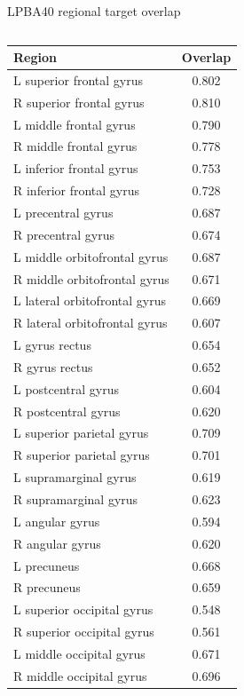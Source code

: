 \documentclass[xcolor=dvipsnames,serif,10pt]{beamer}
\newcommand{\ColIndent}{\hspace{\labelwidth}\hspace{\labelsep}\hspace{\labelsep}\hspace{\labelsep}\hspace{\labelsep}}
\begin{document}
\begin{frame}{LPBA40 regional target overlap}

\setlength{\tabcolsep}{4pt}

\fontsize{5}{6}\selectfont

\begin{columns}[totalwidth=0.7\textwidth,t]
\ColIndent
\begin{column}[t]{5cm}
\begin{tabular}{lc}
{\bf Region} & {\bf Overlap} \\
\hline
L superior frontal gyrus & 0.802 \\
R superior frontal gyrus & 0.810 \\
L middle frontal gyrus & 0.790 \\
R middle frontal gyrus & 0.778 \\
L inferior frontal gyrus & 0.753 \\
R inferior frontal gyrus & 0.728 \\
L precentral gyrus & 0.687 \\
R precentral gyrus & 0.674 \\
L middle orbitofrontal gyrus & 0.687 \\
R middle orbitofrontal gyrus & 0.671 \\
L lateral orbitofrontal gyrus & 0.669 \\
R lateral orbitofrontal gyrus & 0.607 \\
L gyrus rectus & 0.654 \\
R gyrus rectus & 0.652 \\
L postcentral gyrus & 0.604 \\
R postcentral gyrus & 0.620 \\
L superior parietal gyrus & 0.709 \\
R superior parietal gyrus & 0.701 \\
L supramarginal gyrus & 0.619 \\
R supramarginal gyrus & 0.623 \\
L angular gyrus & 0.594 \\
R angular gyrus & 0.620 \\
L precuneus & 0.668 \\
R precuneus & 0.659 \\
L superior occipital gyrus & 0.548 \\
R superior occipital gyrus & 0.561 \\
L middle occipital gyrus & 0.671 \\
R middle occipital gyrus & 0.696 \\

\end{tabular}
\end{column}
\end{columns}
\end{frame}
\end{document}
